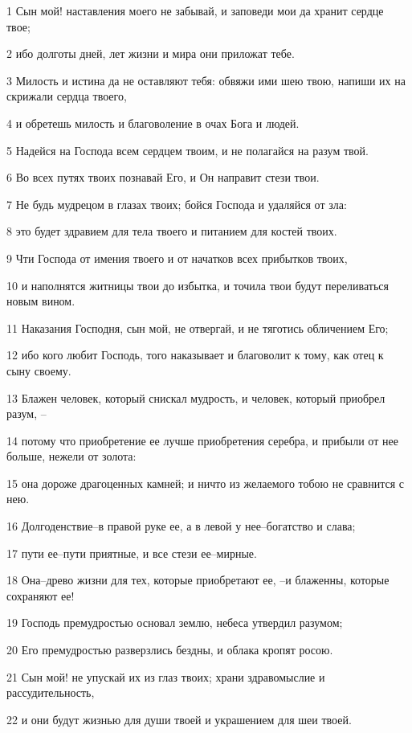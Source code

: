 \par 1 Сын мой! наставления моего не забывай, и заповеди мои да хранит сердце твое;
\par 2 ибо долготы дней, лет жизни и мира они приложат тебе.
\par 3 Милость и истина да не оставляют тебя: обвяжи ими шею твою, напиши их на скрижали сердца твоего,
\par 4 и обретешь милость и благоволение в очах Бога и людей.
\par 5 Надейся на Господа всем сердцем твоим, и не полагайся на разум твой.
\par 6 Во всех путях твоих познавай Его, и Он направит стези твои.
\par 7 Не будь мудрецом в глазах твоих; бойся Господа и удаляйся от зла:
\par 8 это будет здравием для тела твоего и питанием для костей твоих.
\par 9 Чти Господа от имения твоего и от начатков всех прибытков твоих,
\par 10 и наполнятся житницы твои до избытка, и точила твои будут переливаться новым вином.
\par 11 Наказания Господня, сын мой, не отвергай, и не тяготись обличением Его;
\par 12 ибо кого любит Господь, того наказывает и благоволит к тому, как отец к сыну своему.
\par 13 Блажен человек, который снискал мудрость, и человек, который приобрел разум, --
\par 14 потому что приобретение ее лучше приобретения серебра, и прибыли от нее больше, нежели от золота:
\par 15 она дороже драгоценных камней; и ничто из желаемого тобою не сравнится с нею.
\par 16 Долгоденствие--в правой руке ее, а в левой у нее--богатство и слава;
\par 17 пути ее--пути приятные, и все стези ее--мирные.
\par 18 Она--древо жизни для тех, которые приобретают ее, --и блаженны, которые сохраняют ее!
\par 19 Господь премудростью основал землю, небеса утвердил разумом;
\par 20 Его премудростью разверзлись бездны, и облака кропят росою.
\par 21 Сын мой! не упускай их из глаз твоих; храни здравомыслие и рассудительность,
\par 22 и они будут жизнью для души твоей и украшением для шеи твоей.
